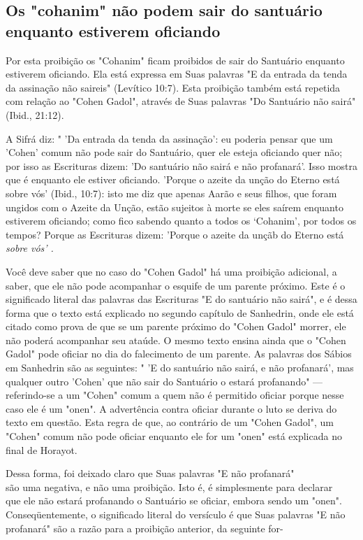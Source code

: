 \begin{itemize}
\begin{enumrate}
\begin{itemize}
\begin{itemize}
\begin{itemize}
\section{Os "cohanim" não podem sair do santuário enquanto estiverem oficiando}

Por esta proibição os "Cohanim" ficam proibidos de sair do Santuá­rio
enquanto estiverem oficiando. Ela está expressa em Suas palavras "E da
en­trada da tenda da assinação não saireis" (Levítico 10:7). Esta
proibição também está repetida com relação ao "Cohen Gadol", através de
Suas palavras "Do San­tuário não sairá" (Ibid., 21:12).

A Sifrá diz: " 'Da entrada da tenda da assinação': eu poderia pensar que
um 'Cohen' comum não pode sair do Santuário, quer ele esteja oficiando
quer não; por isso as Escrituras dizem: 'Do santuário não sairá e não
profanará'. Isso mostra que é enquanto ele estiver oficiando. 'Porque o
azeite da unção do Eterno está sobre vós' (Ibid., 10:7): isto me diz que
apenas Aarão e seus fi­lhos, que foram ungidos com o Azeite da Unção,
estão sujeitos à morte se eles saírem enquanto estiverem oficiando; como
fico sabendo quanto a todos os `Cohanim', por todos os tempos? Porque as
Escrituras dizem: 'Porque o azeite da unçãb do Eterno está \emph{sobre
vós' .}

Você deve saber que no caso do "Cohen Gadol" há uma proibição adicional,
a saber, que ele não pode acompanhar o esquife de um parente pró­ximo.
Este é o significado literal das palavras das Escrituras "E do santuário
não sairá", e é dessa forma que o texto está explicado no segundo
capítulo de Sa­nhedrin, onde ele está citado como prova de que se um
parente próximo do "Cohen Gadol" morrer, ele não poderá acompanhar seu
ataúde. O mesmo tex­to ensina ainda que o "Cohen Gadol" pode oficiar no
dia do falecimento de um parente. As palavras dos Sábios em Sanhedrin
são as seguintes: " 'E do san­tuário não sairá, e não profanará', mas
qualquer outro 'Cohen' que não sair do Santuário o estará profanando"
--- referindo-se a um "Cohen" comum a quem não é permitido oficiar
porque nesse caso ele é um "onen". A advertência con­tra oficiar durante
o luto se deriva do texto em questão. Esta regra de que, ao contrário de
um "Cohen Gadol", um "Cohen" comum não pode oficiar en­quanto ele for um
"onen" está explicada no final de Horayot.


Dessa forma, foi deixado claro que Suas palavras "E não profanará"\\
são uma negativa, e não uma proibição. Isto é, é simplesmente para
declarar\\
que ele não estará profanando o Santuário se oficiar, embora sendo um
"onen".\\
Conseqüentemente, o significado literal do versículo é que Suas palavras
"E não profanará" são a razão para a proibição anterior, da
seguinte for-



\end{itemize}
\end{itemize}
\end{itemize}
\end{enumrate}
\end{itemize}

